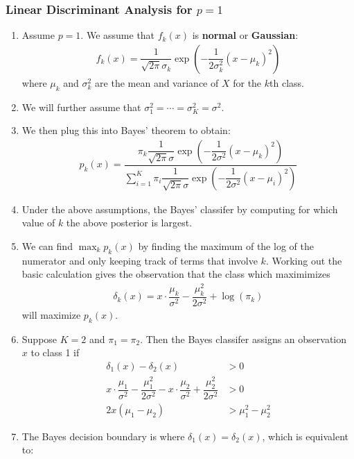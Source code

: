 \documentclass[10pt]{article}
\begin{document}
\subsubsection{Linear Discriminant Analysis for $p = 1$}
\begin{enumerate}
	\item Assume $p = 1$.  We assume that $f_k(x)$ is \textbf{normal} or \textbf{Gaussian}:
	\begin{align*}
		f_k(x) = \dfrac{1}{\sqrt{2\pi} \sigma_k } \exp\left(- \dfrac{1}{2\sigma_k^2}(x - \mu_k)^2\right) 
	\end{align*}
	where $\mu_k$ and $\sigma_k^2$ are the mean and variance of $X$ for the $k$th class.  
	\item We will further assume that $\sigma_1^2 = \cdots = \sigma_K^2 = \sigma^2$.
	\item We then plug this into Bayes' theorem to obtain:
	\begin{align*}
		p_k(x) = \dfrac{\pi_k \dfrac{1}{\sqrt{2\pi} \sigma } \exp\left(- \dfrac{1}{2\sigma^2}(x - \mu_k)^2\right)}{\displaystyle \sum_{i = 1}^K \pi_i \dfrac{1}{\sqrt{2\pi} \sigma } \exp\left(- \dfrac{1}{2\sigma^2}(x - \mu_i)^2\right)}
	\end{align*}
	\item Under the above assumptions, the Bayes' classifer by computing for which value of $k$ the above posterior is largest.  
	\item We can find $\displaystyle \max_k p_k(x)$ by finding the maximum of the log of the numerator and only keeping track of terms that involve $k$.  Working out the basic calculation gives the observation that the class which maximimizes 
	\begin{align*}
		\delta_k(x) = x \cdot \dfrac{\mu_k}{\sigma^2} - \dfrac{\mu_k^2}{2\sigma^2} + \log(\pi_k)
	\end{align*}
	will maximize $p_k(x)$. 
	\item Suppose $K = 2$ and $\pi_1 = \pi_2$. Then the Bayes classifer assigns an observation $x$ to class 1 if 
	\begin{align*}
		\delta_1(x) - \delta_2(x) &> 0 \\
		x\cdot \dfrac{\mu_1}{\sigma^2} - \dfrac{\mu_1^2}{2\sigma^2} - x \cdot \dfrac{\mu_2}{\sigma^2} + \dfrac{\mu_2^2}{2\sigma^2} &> 0 \\
		2x(\mu_1 - \mu_2) &> \mu_1^2 - \mu_2^2 
	\end{align*}
	\item The Bayes decision boundary is where $\delta_1(x) = \delta_2(x)$, which is equivalent to: 

\end{enumerate}
\end{document}
